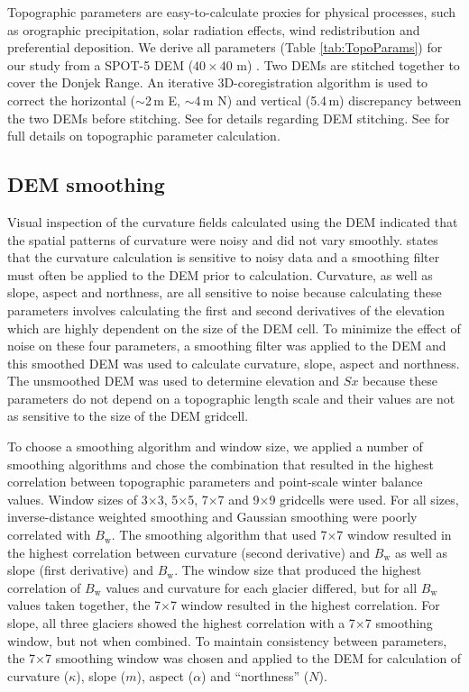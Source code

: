 \documentclass[onecolumn, letterpaper]{igs}
\begin{document}
Topographic parameters are easy-to-calculate proxies for physical processes, such as orographic precipitation, solar radiation effects, wind redistribution and preferential deposition. We derive all parameters (Table \ref{tab:TopoParams}) for our study from a SPOT-5 DEM ($40\times40$ m) \citep{Korona2009}. Two DEMs are stitched together to cover the Donjek Range. An iterative 3D-coregistration algorithm \citep{Berthier2007} is used to correct the horizontal ($\sim$2\,m E, $\sim$4\,m N) and vertical (5.4\,m) discrepancy between the two DEMs before stitching. See \cite{Pulwicki2017} for details regarding DEM stitching. See \cite{Pulwicki2017} for full details on topographic parameter calculation.

\subsection*{DEM smoothing}

Visual inspection of the curvature fields calculated using the DEM indicated that the spatial patterns of curvature were noisy and did not vary smoothly. \cite{Olaya2009} states that the curvature calculation is sensitive to noisy data and a smoothing filter must often be applied to the DEM prior to calculation. Curvature, as well as slope, aspect and northness, are all sensitive to noise because calculating these parameters involves calculating the first and second derivatives of the elevation which are highly dependent on the size of the DEM cell. To minimize the effect of noise on these four parameters, a smoothing filter was applied to the DEM and this smoothed DEM was used to calculate curvature, slope, aspect and northness. The unsmoothed DEM was used to determine elevation and $Sx$ because these parameters do not depend on a topographic length scale and their values are not as sensitive to the size of the DEM gridcell.

To choose a smoothing algorithm and window size, we applied a number of smoothing algorithms and chose the combination that resulted in the highest correlation between topographic parameters and point-scale winter balance values. Window sizes of 3$\times$3, 5$\times$5, 7$\times$7 and 9$\times$9 gridcells were used. For all sizes, inverse-distance weighted smoothing and Gaussian smoothing were poorly correlated with $B_\mathrm{w}$. The smoothing algorithm that used 7$\times$7 window resulted in the highest correlation between curvature (second derivative) and $B_\mathrm{w}$ as well as slope (first derivative) and $B_\mathrm{w}$. The window size that produced the highest correlation of $B_\mathrm{w}$ values and curvature for each glacier differed, but for all $B_\mathrm{w}$ values taken together, the 7$\times$7 window resulted in the highest correlation. For slope, all three glaciers showed the highest correlation with a 7$\times$7 smoothing window, but not when combined. To maintain consistency between parameters, the 7$\times$7 smoothing window was chosen and applied to the DEM for calculation of curvature ($\kappa$), slope ($m$), aspect ($\alpha$) and ``northness'' ($N$). 
\end{document}
